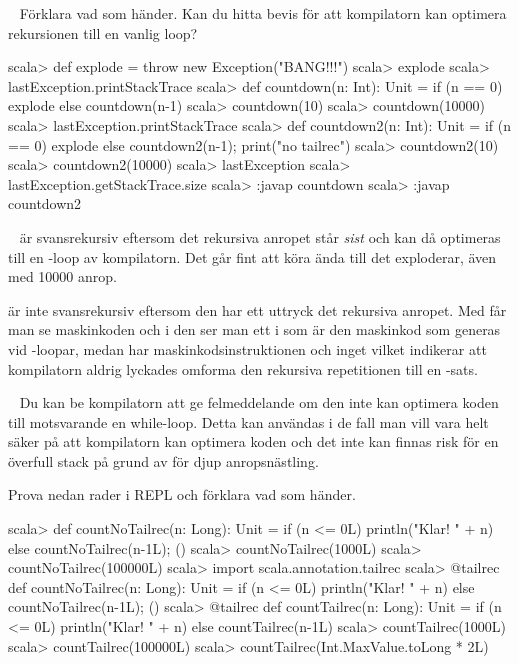\QUESTEND




\QUESTBEGIN

\Task\Uberkurs  \what~  Förklara vad som händer. Kan du hitta bevis för att kompilatorn kan optimera rekursionen till en vanlig loop?

\begin{REPL}
scala> def explode = throw new Exception("BANG!!!")
scala> explode
scala> lastException.printStackTrace
scala> def countdown(n: Int): Unit =
         if (n == 0) explode else countdown(n-1)
scala> countdown(10)
scala> countdown(10000)
scala> lastException.printStackTrace
scala> def countdown2(n: Int): Unit =
         if (n == 0) explode else {countdown2(n-1); print("no tailrec")}
scala> countdown2(10)
scala> countdown2(10000)
scala> lastException
scala> lastException.getStackTrace.size
scala> :javap countdown
scala> :javap countdown2
\end{REPL}

\SOLUTION

\TaskSolved \what~ är svansrekursiv eftersom det rekursiva anropet står \emph{sist} och kan då optimeras till en -loop av kompilatorn. Det går fint att köra ända till det exploderar, även med 10000 anrop.

 är inte svansrekursiv eftersom den har ett uttryck  det rekursiva anropet. Med  får man se maskinkoden och i den ser man ett  i  som är den maskinkod som generas vid -loopar, medan  har maskinkodsinstruktionen  och inget  vilket indikerar att kompilatorn aldrig lyckades omforma den rekursiva repetitionen till en -sats.

\QUESTEND




\QUESTBEGIN

\Task\Uberkurs  \what~  Du kan be kompilatorn att ge felmeddelande om den inte kan optimera koden till motsvarande en while-loop. Detta kan användas i de fall man vill vara helt säker på att kompilatorn kan optimera koden och det inte kan finnas risk för en överfull stack  på grund av för djup anropsnästling.

Prova nedan rader i REPL och förklara vad som händer.
\begin{REPL}
scala> def countNoTailrec(n: Long): Unit =
         if (n <= 0L) println("Klar! " + n) else {countNoTailrec(n-1L); ()}
scala> countNoTailrec(1000L)
scala> countNoTailrec(100000L)
scala> import scala.annotation.tailrec
scala> @tailrec def countNoTailrec(n: Long): Unit =
         if (n <= 0L) println("Klar! " + n) else {countNoTailrec(n-1L); ()}
scala> @tailrec def countTailrec(n: Long): Unit =
         if (n <= 0L) println("Klar! " + n) else countTailrec(n-1L)
scala> countTailrec(1000L)
scala> countTailrec(100000L)
scala> countTailrec(Int.MaxValue.toLong * 2L)
\end{REPL}

